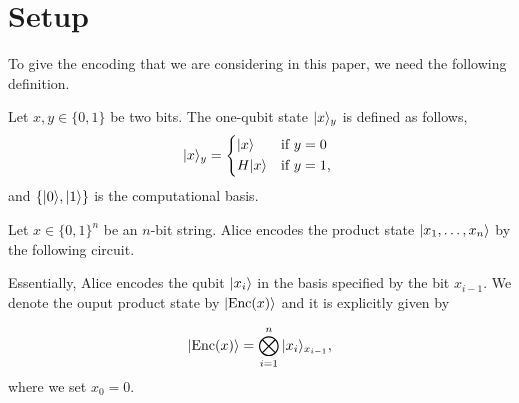 \section{Setup}

To give the encoding that we are considering in this paper, we need the following definition.
\begin{definition}
 Let $x,y\in \{0,1\}$ be two bits. The one-qubit state $|x\rangle_y$ is defined as follows,
 \begin{equation*}
  \ket{x}_y =
    \begin{cases*}
      \ket{x} & if $y=0$\\
      H\ket{x} & if $y=1$,
    \end{cases*}
 \end{equation*}
 and $\{|0\rangle,|1\rangle\}$ is the computational basis.

\end{definition}


Let $x\in \{0,1\}^n$ be an $n$-bit string. Alice encodes the product state $|x_1,\dots,x_n\rangle$ by the following circuit.

Essentially, Alice encodes the qubit $|x_i\rangle$ in the basis specified by the bit $x_{i-1}$. We denote the ouput product state by $|\mathrm{Enc}(x)\rangle$ and it is explicitly given by

\begin{align*}
 |\mathrm{Enc}(x)\rangle = \bigotimes_{i=1}^n|x_i\rangle_{x_{i-1}},
\end{align*}
where we set $x_0=0$.
